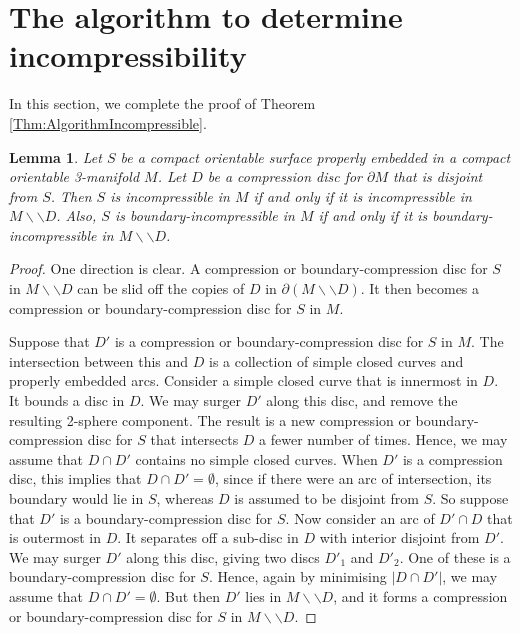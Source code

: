 \documentclass[oneside]{amsart}
\numberwithin{equation}{section}
\theoremstyle{plain}
\newtheorem{lemma}[equation]{Lemma}
\theoremstyle{definition}
\newcommand{\cut}{\backslash\backslash}
\begin{document}
\section{The algorithm to determine incompressibility}
\label{Sec:AlgorithmIncompressible}

In this section, we complete the proof of Theorem \ref{Thm:AlgorithmIncompressible}.

\begin{lemma}
\label{Lem:CompressibilityPreserved}
Let $S$ be a compact orientable surface properly embedded in a compact orientable 3-manifold $M$. Let $D$ be a compression disc for $\partial M$ that is disjoint from $S$. Then $S$ is incompressible in $M$ if and only if it is incompressible in $M \cut D$. Also, $S$ is boundary-incompressible in $M$ if and only if it is boundary-incompressible in $M \cut D$.
\end{lemma}

\begin{proof}
One direction is clear. A compression or boundary-compression disc for $S$ in $M \cut D$ can be slid off the copies of $D$ in $\partial (M \cut D)$. It then becomes
a compression or boundary-compression disc for $S$ in $M$.

Suppose that $D'$ is a compression or boundary-compression disc for $S$ in $M$. 
The intersection between this and $D$ is a collection of simple closed curves and properly embedded arcs.
Consider a simple closed curve that is innermost in $D$. It bounds a disc in $D$. We may surger $D'$ along this disc, and remove the resulting 2-sphere component. The result is a new compression or boundary-compression disc for $S$ that intersects $D$ a fewer number of times. Hence, we may assume that $D \cap D'$ contains no simple closed curves. When $D'$ is a compression disc, this implies that $D \cap D' = \emptyset$, since if there were an arc of intersection, its boundary would lie in $S$, whereas $D$ is assumed to be disjoint from $S$. So suppose that $D'$ is a boundary-compression disc for $S$. Now consider an arc of $D' \cap D$ that is outermost in $D$. It separates off a sub-disc in $D$ with interior disjoint from $D'$. We may surger $D'$ along this disc, giving two discs $D'_1$ and $D'_2$. One of these is a boundary-compression disc for $S$. Hence, again by minimising $|D \cap D'|$, we may assume that $D \cap D' = \emptyset$. But then $D'$ lies in $M \cut D$, and it forms a compression or boundary-compression disc for $S$ in $M \cut D$.
\end{proof}
\end{document}
